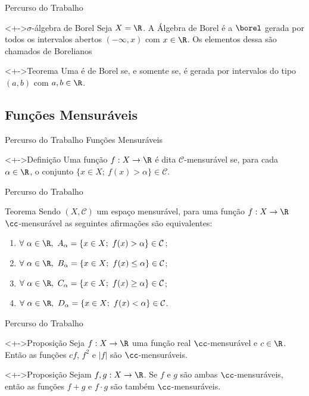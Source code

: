  	\begin{frame}{Percurso do Trabalho}
 		\begin{block}<+->{$\sigma$-álgebra de Borel}
 			\justify Seja $X = \R$. A Álgebra de Borel é a \sigal $\borel$ gerada por todos os intervalos abertos $(-\infty,x)$ com $ x  \in \R$. 
 			Os elementos dessa \sigal são chamados de Borelianos
 		\end{block}
 		\begin{block}<+->{Teorema}
 			\justify Uma \sigal é de Borel  se, e somente se, é gerada por intervalos do tipo $(a,b)$ com $a,b \in \R$.
 		\end{block}
 	\end{frame}
	\subsection{Funções Mensuráveis}
	\begin{frame}{Percurso do Trabalho} %
    {Funções Mensuráveis}
  		\begin{block}<+->{Definição}
  			\justify Uma função $f: X \to \R $ é dita $\mathcal{C}$-mensurável se, para cada $\alpha \in \R$, o conjunto $\{x \in X;\ f(x) > \alpha\} \in \mathcal{C}$.
  		\end{block}
	\end{frame} %
	
	\begin{frame}{Percurso do Trabalho}
		\begin{block}{Teorema}
		 \justify Sendo $(X,\mathcal{C})$ um espaço mensurável, para uma função $f: X \to \R$ $\cc$-mensurável as seguintes afirmações são equivalentes: 	
			\begin{enumerate}[<+->]
				\item $\forall \ \alpha \in \R, \ A_\alpha =\{x \in X;\ f(x) > \alpha \} \in \mathcal{C}$;
				\item $\forall \ \alpha \in \R, \ B_\alpha =\{x \in X;\ f(x) \leq \alpha \} \in \mathcal{C}$;
				\item $\forall \ \alpha \in \R, \ C_\alpha =\{x \in X;\ f(x) \geq \alpha \} \in \mathcal{C}$;
				\item $\forall \ \alpha \in \R, \ D_\alpha =\{x \in X;\ f(x) < \alpha \} \in \mathcal{C}$.
			\end{enumerate}
		\end{block}
	\end{frame}

	\begin{frame}{Percurso do Trabalho}
		\begin{block}<+->{Proposição}
			\justify Seja $f: X \to \R$ uma função real $\cc$-mensurável e $c \in \R$. Então as funções $cf$, $f^2$ e $|f|$ são $\cc$-mensuráveis.
		\end{block}
		\begin{block}<+->{Proposição}
			\justify Sejam $f,g:X \to \R$. Se $f$ e $g$ são ambas $\cc$-mensuráveis, então as funções $f+g$ e $f\cdot g$ são também $\cc$-mensuráveis.
		\end{block}
	\end{frame}
	
